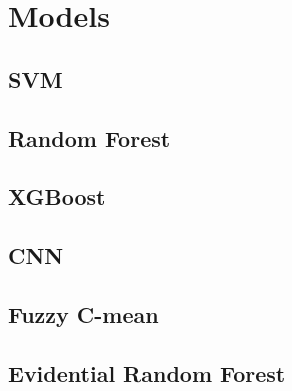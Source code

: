 \section{Models}\label{sec:models}

  \subsection{SVM}\label{model:SVM}

  \subsection{Random Forest}\label{model:RF}

  \subsection{XGBoost}\label{model:Xgboost}

  \subsection{CNN}\label{model:CNN}

  \subsection{Fuzzy C-mean}\label{model:fuzzy-c}
  \subsection{Evidential Random Forest}\label{model:ERF}

